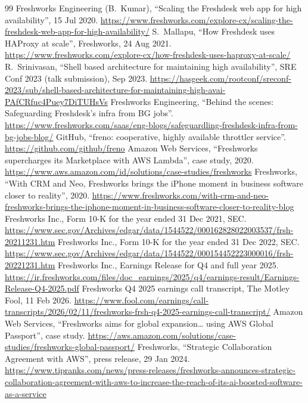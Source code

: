 \documentclass[10pt,a4paper]{article}
\begin{document}
\begin{thebibliography}{99}\small
\setlength{\itemsep}{1pt}
 Freshworks Engineering (B.~Kumar), ``Scaling the Freshdesk web app for high availability'', 15 Jul 2020. \url{https://www.freshworks.com/explore-cx/scaling-the-freshdesk-web-app-for-high-availability/}
 S.~Mallapu, ``How Freshdesk uses HAProxy at scale'', Freshworks, 24 Aug 2021. \url{https://www.freshworks.com/explore-cx/how-freshdesk-uses-haproxy-at-scale/}
 R.~Srinivasan, ``Shell based architecture for maintaining high availability'', SRE Conf 2023 (talk submission), Sep 2023. \url{https://hasgeek.com/rootconf/sreconf-2023/sub/shell-based-architecture-for-maintaining-high-avai-PAfCRfuc4Puey7DiTUHsVs}
 Freshworks Engineering, ``Behind the scenes: Safeguarding Freshdesk's infra from BG jobs''. \url{https://www.freshworks.com/saas/eng-blogs/safeguardling-freshdesk-infra-from-bg-jobs-blog/}
 GitHub, ``freno: cooperative, highly available throttler service''. \url{https://github.com/github/freno}
 Amazon Web Services, ``Freshworks supercharges its Marketplace with AWS Lambda'', case study, 2020. \url{https://www.aws.amazon.com/id/solutions/case-studies/freshworks}
 Freshworks, ``With CRM and Neo, Freshworks brings the iPhone moment in business software closer to reality'', 2020. \url{https://www.freshworks.com/with-crm-and-neo-freshworks-brings-the-iphone-moment-in-business-software-closer-to-reality-blog}
 Freshworks Inc., Form 10-K for the year ended 31 Dec 2021, SEC. \url{https://www.sec.gov/Archives/edgar/data/1544522/000162828022003537/frsh-20211231.htm}
 Freshworks Inc., Form 10-K for the year ended 31 Dec 2022, SEC. \url{https://www.sec.gov/Archives/edgar/data/1544522/000154452223000016/frsh-20221231.htm}
 Freshworks Inc., Earnings Release for Q4 and full year 2025. \url{https://ir.freshworks.com/files/doc_earnings/2025/q4/earnings-result/Earnings-Release-Q4-2025.pdf}
 Freshworks Q4 2025 earnings call transcript, The Motley Fool, 11 Feb 2026. \url{https://www.fool.com/earnings/call-transcripts/2026/02/11/freshworks-frsh-q4-2025-earnings-call-transcript/}
 Amazon Web Services, ``Freshworks aims for global expansion\ldots{} using AWS Global Passport'', case study. \url{https://aws.amazon.com/solutions/case-studies/freshworks-global-passport/}
 Freshworks, ``Strategic Collaboration Agreement with AWS'', press release, 29 Jan 2024. \url{https://www.tipranks.com/news/press-releases/freshworks-announces-strategic-collaboration-agreement-with-aws-to-increase-the-reach-of-its-ai-boosted-software-as-a-service}

\end{thebibliography}
\end{document}
